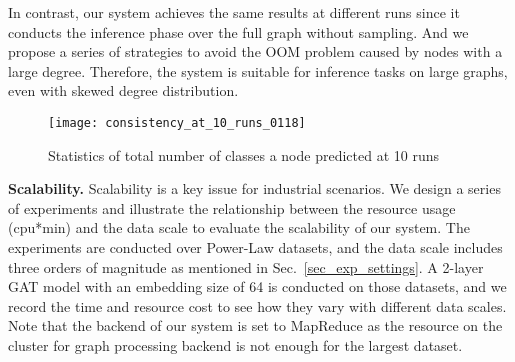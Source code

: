 \documentclass[conference]{IEEEtran}
\begin{document}


In contrast, our system achieves the same results at different runs since it conducts the inference phase over the full graph without sampling.
And we propose a series of strategies to avoid the OOM problem caused by nodes with a large degree.
Therefore, the system is suitable for inference tasks on large graphs, even with skewed degree distribution.

\begin{figure}
\centering
\texttt{[image: consistency\_at\_10\_runs\_0118]}
\caption{Statistics of total number of classes a node predicted at 10 runs}
\label{fig:consistency}
\end{figure}


\textbf{Scalability.} 
Scalability is a key issue for industrial scenarios.
We design a series of experiments and illustrate the relationship between the resource usage (cpu*min) and the data scale to evaluate the scalability of our system.
The experiments are conducted over Power-Law datasets, and the data scale includes three orders of magnitude as mentioned in Sec.~\ref{sec_exp_settings}.
A 2-layer GAT model with an embedding size of 64 is conducted on those datasets, and we record the time and resource cost to see how they vary with different data scales.
Note that the backend of our system is set to MapReduce as the resource on the cluster for graph processing backend is not enough for the largest dataset.
\end{document}
